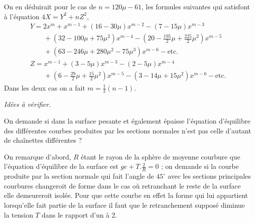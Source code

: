 \documentclass[11pt,a4paper]{article}
\begin{document}
On en déduirait pour le cas de $n = 120\mu - 61$, les formules suivantes
qui satisfont à l'équation $4X = Y^2 + nZ^2$,
\[
\begin{array}{l}
Y = 2x^m + x^{m-1} + (16 - 30\mu)x^{m-2} - (7 - 15\mu)x^{m-3} \\
\qquad + (32 - 100\mu + 75\mu^2)x^{m-4} - \left(20 - \frac{195}{2}\mu + \frac{225}{2}\mu^2\right)x^{m-5} \\
\qquad + (63 - 246\mu + 280\mu^2 - 75\mu^3)x^{m-6} - \text{etc.} \\
Z = x^{m-1} + (3 - 5\mu)x^{m-3} - (2 - 5\mu)x^{m-4} \\
\qquad + \left(6 - \frac{29}{2}\mu + \frac{15}{2}\mu^2\right)x^{m-5} - (3 - 14\mu + 15\mu^2)x^{m-6} - \text{etc.}
\end{array}
\]
Dans les deux cas on a fait $m = \frac{1}{2}(n - 1)$.


\emph{Idées à vérifier.}

On demande si dans la surface pesante et également épaisse l'équation
d'équilibre des différentes courbes produites par les sections normales
n'est pas celle d'autant de chaînettes différentes ?

On remarque d'abord, $R$ étant le rayon de la sphère de moyenne courbure que
l'équation d'équilibre de la surface est $ge + T.\frac{2}{R} = 0$ ; on demande
si la courbe produite par la section normale qui fait l'angle de $45^\circ$
avec les sections principales courbures changeroit de forme dans le cas où
retranchant le reste de la surface elle demeureroit isolée. Pour que cette
courbe  en effet la forme qui lui appartient lorsqu'elle
fait partie de la surface il faut que le retranchement supposé diminue la
tension $T$ dans le rapport d'un à 2.
\end{document}
